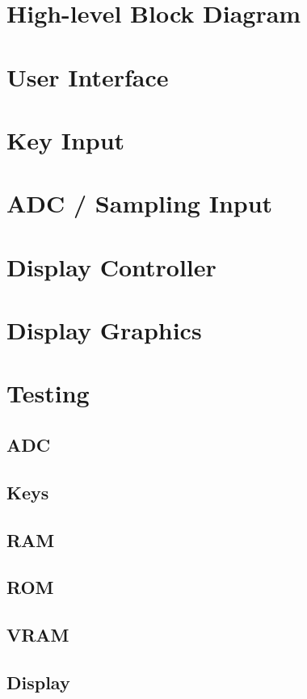 \section{High-level Block Diagram}

\section{User Interface}

\section{Key Input}

\section{ADC / Sampling Input}

\section{Display Controller}

\section{Display Graphics}

\section{Testing}

\subsection{ADC}

\subsection{Keys}

\subsection{RAM}

\subsection{ROM}

\subsection{VRAM}

\subsection{Display}
